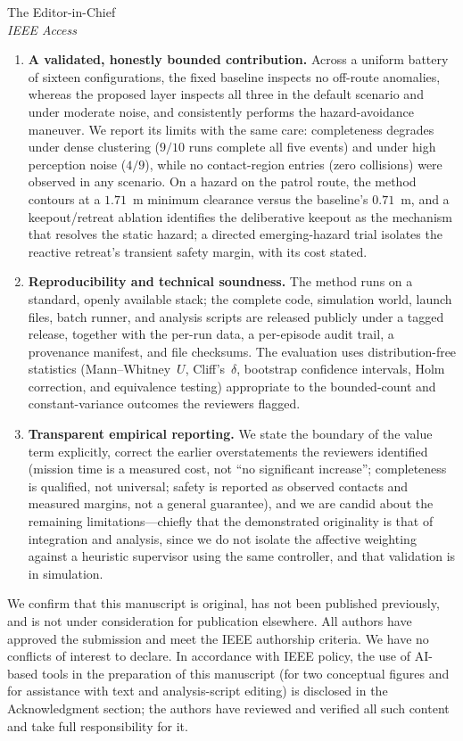 \documentclass[11pt]{letter}
\begin{document}
\begin{letter}{The Editor-in-Chief\\\textit{IEEE Access}}
\begin{enumerate}
\item \textbf{A validated, honestly bounded contribution.} Across a uniform
battery of sixteen configurations, the fixed baseline inspects no off-route
anomalies, whereas the proposed layer inspects all three in the default scenario
and under moderate noise, and consistently performs the hazard-avoidance
maneuver. We report its limits with the same care: completeness degrades under
dense clustering ($9/10$ runs complete all five events) and under high perception
noise ($4/9$), while no contact-region entries (zero collisions) were observed in
any scenario. On a hazard on the patrol route, the method contours at a
$1.71$~m minimum clearance versus the baseline's $0.71$~m, and a keepout/retreat
ablation identifies the deliberative keepout as the mechanism that resolves the
static hazard; a directed emerging-hazard trial isolates the reactive retreat's
transient safety margin, with its cost stated.

\item \textbf{Reproducibility and technical soundness.} The method runs on a
standard, openly available stack; the complete code, simulation world, launch
files, batch runner, and analysis scripts are released publicly under a tagged
release, together with the per-run data, a per-episode audit trail, a provenance
manifest, and file checksums. The evaluation uses distribution-free statistics
(Mann--Whitney~$U$, Cliff's~$\delta$, bootstrap confidence intervals, Holm
correction, and equivalence testing) appropriate to the bounded-count and
constant-variance outcomes the reviewers flagged.

\item \textbf{Transparent empirical reporting.} We state the boundary of the
value term explicitly, correct the earlier overstatements the reviewers
identified (mission time is a measured cost, not ``no significant increase'';
completeness is qualified, not universal; safety is reported as observed contacts
and measured margins, not a general guarantee), and we are candid about the
remaining limitations---chiefly that the demonstrated originality is that of
integration and analysis, since we do not isolate the affective weighting against
a heuristic supervisor using the same controller, and that validation is in
simulation.
\end{enumerate}

We confirm that this manuscript is original, has not been published previously,
and is not under consideration for publication elsewhere. All authors have
approved the submission and meet the IEEE authorship criteria. We have no
conflicts of interest to declare. In accordance with IEEE policy, the use of
AI-based tools in the preparation of this manuscript (for two conceptual figures
and for assistance with text and analysis-script editing) is disclosed in the
Acknowledgment section; the authors have reviewed and verified all such content
and take full responsibility for it.


\end{letter}
\end{document}
